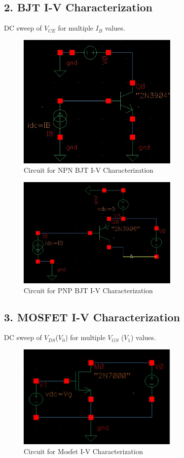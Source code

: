 \documentclass[12pt,a4paper]{article}
\begin{document}
\subsection*{2. BJT I-V Characterization}
DC sweep of \( V_{CE} \) for multiple \( I_B \) values.
\begin{figure}[H]
    \centering
    \includegraphics[width=0.7\textwidth]{figs/BJT/NPN/Circuit.jpg} %
    \caption{Circuit for NPN BJT I-V Characterization}
\end{figure}
\begin{figure}[H]
    \centering
    \includegraphics[width=0.7\textwidth]{figs/BJT/PNP/Circuit.jpg} %
    \caption{Circuit for PNP BJT I-V Characterization}
\end{figure}
\subsection*{3. MOSFET I-V Characterization}
DC sweep of \( V_{DS} \)($V_0$) for multiple \( V_{GS} \) ($V_1$) values.
\begin{figure}[H]
    \centering
    \includegraphics[width=0.7\textwidth]{figs/Mosfet/Circuit.jpg} %
    \caption{Circuit for Mosfet I-V Characterization}
\end{figure}
\end{document}
